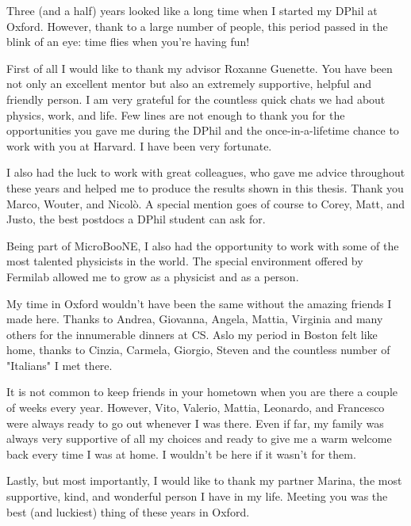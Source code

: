 Three (and a half) years looked like a long time when I started my DPhil at Oxford. However, thank to a large number of people, this period passed in the blink of an eye: time flies when you're having fun!

First of all I would like to thank my advisor Roxanne Guenette. You have been not only an excellent mentor but also an extremely supportive, helpful and friendly person. I am very grateful for the countless quick chats we had about physics, work, and life. Few lines are not enough to thank you for the opportunities you gave me during the DPhil and the once-in-a-lifetime chance to work with you at Harvard. I have been very fortunate.

I also had the luck to work with great colleagues, who gave me advice throughout these years and helped me to produce the results shown in this thesis. Thank you Marco, Wouter, and Nicolò. A special mention goes of course to Corey, Matt, and Justo, the best postdocs a DPhil student can ask for.

Being part of MicroBooNE, I also had the opportunity to work with some of the most talented physicists in the world. The special environment offered by Fermilab allowed me to grow as a physicist and as a person.

My time in Oxford wouldn't have been the same without the amazing friends I made here. Thanks to Andrea, Giovanna, Angela, Mattia, Virginia and many others for the innumerable dinners at CS.
Aslo my period in Boston felt like home, thanks to Cinzia, Carmela, Giorgio, Steven and the countless number of "Italians" I met there. 

It is not common to keep friends in your hometown when you are there a couple of weeks every year. However, Vito, Valerio, Mattia, Leonardo, and Francesco were always ready to go out whenever I was there.
Even if far, my family was always very supportive of all my choices and ready to give me a warm welcome back every time I was at home. I wouldn't be here if it wasn't for them.

Lastly, but most importantly, I would like to thank my partner Marina, the most supportive, kind, and wonderful person I have in my life. Meeting you was the best (and luckiest) thing of these years in Oxford.